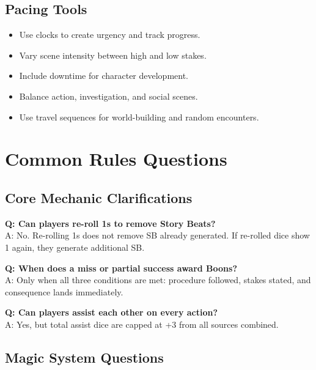 \subsection{Pacing Tools}
\label{subsec:pacing-tools-ref}

\begin{itemize}
\item Use clocks to create urgency and track progress.
\item Vary scene intensity between high and low stakes.
\item Include downtime for character development.
\item Balance action, investigation, and social scenes.
\item Use travel sequences for world-building and random encounters.
\end{itemize}

\section{Common Rules Questions}
\label{sec:rules-questions}

\subsection{Core Mechanic Clarifications}
\label{subsec:core-clarifications}

\textbf{Q: Can players re-roll 1s to remove Story Beats?}\\
A: No. Re-rolling 1s does not remove SB already generated. If re-rolled dice show 1 again, they generate additional SB.

\textbf{Q: When does a miss or partial success award Boons?}\\
A: Only when all three conditions are met: procedure followed, stakes stated, and consequence lands immediately.

\textbf{Q: Can players assist each other on every action?}\\
A: Yes, but total assist dice are capped at +3 from all sources combined.

\subsection{Magic System Questions}
\label{subsec:magic-questions}

